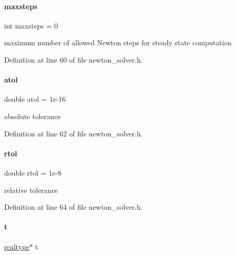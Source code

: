 \mbox{\label{classamici_1_1_newton_solver_a029415ebe024ac6281fd9f190aefb2ee}} 
\paragraph{\texorpdfstring{maxsteps}{maxsteps}}
{\footnotesize\ttfamily int maxsteps = 0}

maximum number of allowed Newton steps for steady state computation 

Definition at line 60 of file newton\+\_\+solver.\+h.

\mbox{\label{classamici_1_1_newton_solver_a60c6dfc476dd9596072f61c2ec8d58ed}} 
\paragraph{\texorpdfstring{atol}{atol}}
{\footnotesize\ttfamily double atol = 1e-\/16}

absolute tolerance 

Definition at line 62 of file newton\+\_\+solver.\+h.

\mbox{\label{classamici_1_1_newton_solver_a4587afeee8941ba7c208b3690a3eeaa7}} 
\paragraph{\texorpdfstring{rtol}{rtol}}
{\footnotesize\ttfamily double rtol = 1e-\/8}

relative tolerance 

Definition at line 64 of file newton\+\_\+solver.\+h.

\mbox{\label{classamici_1_1_newton_solver_ad94d61da9b85c1a151ffd8e228758c7c}} 
\paragraph{\texorpdfstring{t}{t}}
{\footnotesize\ttfamily \mbox{\hyperlink{namespaceamici_a1bdce28051d6a53868f7ccbf5f2c14a3}{realtype}}$\ast$ t\hspace{0.3cm}{\ttfamily [protected]}}

